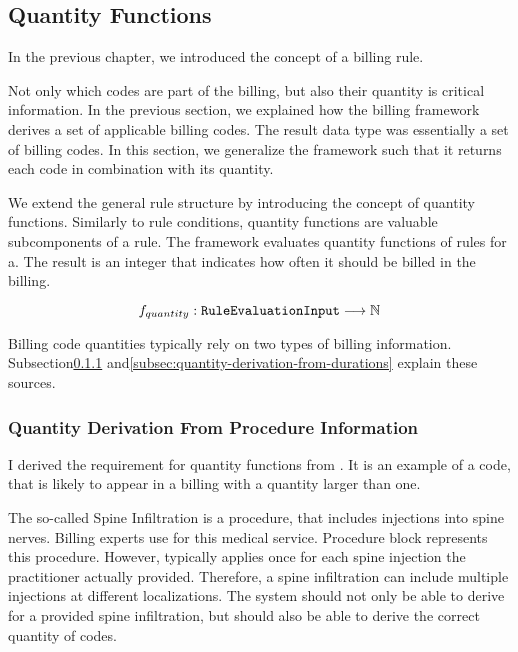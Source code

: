 \subsection{Quantity Functions}\label{subsec:quantity-functions}

In the previous chapter, we introduced the concept of a billing rule.

Not only which codes are part of the billing, but also their quantity is critical information.
In the previous section, we explained how the billing framework derives a set of applicable billing codes.
The result data type was essentially a set of billing codes.
In this section, we generalize the framework such that it returns each code in combination with its quantity.

We extend the general rule structure by introducing the concept of quantity functions.
Similarly to rule conditions, quantity functions are valuable subcomponents of a rule.
The framework evaluates quantity functions of rules for a.
The result is an integer that indicates how often it should be billed in the billing.

\begin{equation}
    \label{eq:quantity-function-natural}
    f_{quantity}: \texttt{RuleEvaluationInput} \longrightarrow \mathbb{N}
\end{equation}

Billing code quantities typically rely on two types of billing information.
Subsection\ref{subsubsec:quantity-derivation-from-procedure-information} and\ref{subsec:quantity-derivation-from-durations} explain these sources.

\subsubsection{Quantity Derivation From Procedure Information}\label{subsubsec:quantity-derivation-from-procedure-information}

I derived the requirement for quantity functions from .
It is an example of a code, that is likely to appear in a billing with a quantity larger than one.

The so-called Spine Infiltration is a procedure, that includes injections into spine nerves.
Billing experts use  for this medical service.
Procedure block  represents this procedure.
However,  typically applies once for each spine injection the practitioner actually provided.
Therefore, a spine infiltration can include multiple injections at different localizations.
The system should not only be able to derive  for a provided spine infiltration, but should also be able to derive the correct quantity of  codes.

